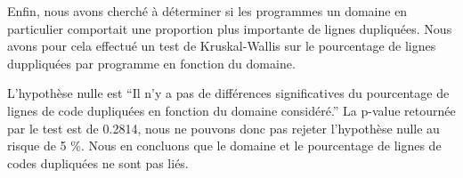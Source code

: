 Enfin, nous avons cherché à déterminer si les programmes un domaine en
particulier comportait une proportion plus importante de lignes
dupliquées. Nous avons pour cela effectué un test de Kruskal-Wallis
sur le pourcentage de lignes duppliquées par programme en fonction du
domaine.

L'hypothèse nulle est ``Il n'y a pas de différences significatives du
pourcentage de lignes de code dupliquées en fonction du domaine
considéré.'' La p-value retournée par le test est de 0.2814, nous ne
pouvons donc pas rejeter l'hypothèse nulle au risque de 5 \%. Nous en
concluons que le domaine et le pourcentage de lignes de codes
dupliquées ne sont pas liés. 
